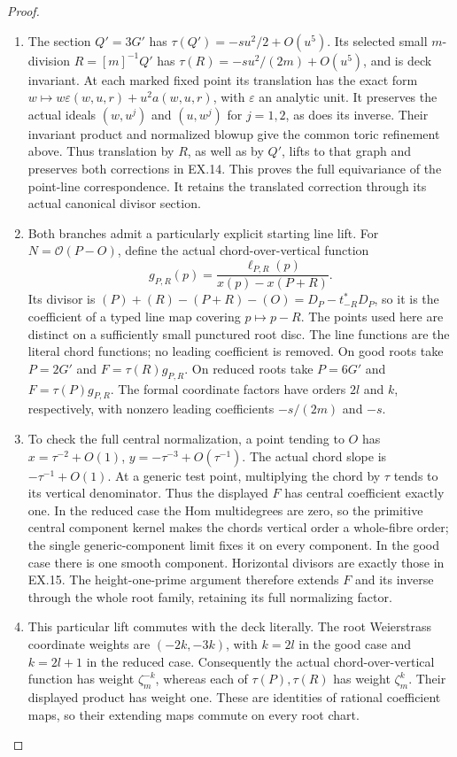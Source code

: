 \begin{proof}
\begin{enumerate}[label=\arabic*.]
\item The section \(Q'=3G'\) has
\(\tau(Q')=-s u^2/2+O(u^5)\). Its selected small
\(m\)-division \(R=[m]^{-1}Q'\) has
\(\tau(R)=-s u^2/(2m)+O(u^5)\), and is deck invariant.
At each marked fixed point its translation has the exact form
\(w\mapsto w\varepsilon(w,u,r)+u^2 a(w,u,r)\), with
\(\varepsilon\) an analytic unit. It preserves the actual
ideals \((w,u^j)\) and \((u,w^j)\) for \(j=1,2\), as
does its inverse. Their invariant product and normalized blowup
give the common toric refinement above. Thus translation by
\(R\), as well as by \(Q'\), lifts to that graph and preserves
both corrections in EX.14. This proves the full equivariance of
the point-line correspondence. It retains the translated
correction through its actual canonical divisor section.

\item Both branches admit a particularly explicit starting line lift.
For \(N=\mathcal O(P-O)\), define the actual chord-over-vertical
function
\[
 g_{P,R}(p)=\frac{\ell_{P,R}(p)}{x(p)-x(P+R)}.
 \tag{EX.15}
\]
Its divisor is \((P)+(R)-(P+R)-(O)=D_P-t_{-R}^*D_P\),
so it is the coefficient of a typed line map covering
\(p\mapsto p-R\). The points used here are distinct on a
sufficiently small punctured root disc. The line functions are
the literal chord functions; no leading coefficient is removed.
On good roots take \(P=2G'\) and
\(F=\tau(R)g_{P,R}\). On reduced roots take \(P=6G'\) and
\(F=\tau(P)g_{P,R}\). The formal coordinate factors have
orders \(2l\) and \(k\), respectively, with nonzero leading
coefficients \(-s/(2m)\) and \(-s\).

\item To check the full central normalization, a point tending to
\(O\) has \(x=\tau^{-2}+O(1)\),
\(y=-\tau^{-3}+O(\tau^{-1})\). The actual chord slope is
\(-\tau^{-1}+O(1)\). At a generic test point, multiplying
the chord by \(\tau\) tends to its vertical denominator.
Thus the displayed \(F\) has central coefficient exactly one.
In the reduced case the Hom multidegrees are zero, so the
primitive central component kernel makes the chord\textquotesingle s vertical
order a whole-fibre order; the single generic-component limit
fixes it on every component. In the good case there is one
smooth component. Horizontal divisors are exactly those in
EX.15. The height-one-prime argument therefore extends \(F\)
and its inverse through the whole root family, retaining its
full normalizing factor.

\item This particular lift commutes with the deck literally. The
root Weierstrass coordinate weights are \((-2k,-3k)\), with
\(k=2l\) in the good case and \(k=2l+1\) in the reduced case.
Consequently the actual chord-over-vertical function has weight
\(\zeta_m^{-k}\), whereas each of \(\tau(P),\tau(R)\)
has weight \(\zeta_m^k\). Their displayed product has weight
one. These are identities of rational coefficient maps, so
their extending maps commute on every root chart.


\end{enumerate}
\end{proof}
